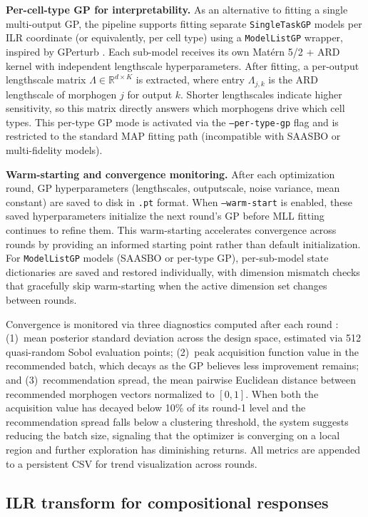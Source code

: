 \documentclass[times,twoside]{zHenriquesLab-StyleBioRxiv}
\newcommand{\Real}{\mathbb{R}}
\begin{document}
\textbf{Per-cell-type GP for interpretability.} As an alternative to fitting a single multi-output GP, the pipeline supports fitting separate \texttt{SingleTaskGP} models per ILR coordinate (or equivalently, per cell type) using a \texttt{ModelListGP} wrapper, inspired by GPerturb \cite{Xing2025gperturb}. Each sub-model receives its own Mat\'{e}rn 5/2 + ARD kernel with independent lengthscale hyperparameters. After fitting, a per-output lengthscale matrix $\Lambda \in \Real^{d \times K}$ is extracted, where entry $\Lambda_{j,k}$ is the ARD lengthscale of morphogen $j$ for output $k$. Shorter lengthscales indicate higher sensitivity, so this matrix directly answers which morphogens drive which cell types. This per-type GP mode is activated via the \texttt{--per-type-gp} flag and is restricted to the standard MAP fitting path (incompatible with SAASBO or multi-fidelity models).

\textbf{Warm-starting and convergence monitoring.} After each optimization round, GP hyperparameters (lengthscales, outputscale, noise variance, mean constant) are saved to disk in \texttt{.pt} format. When \texttt{--warm-start} is enabled, these saved hyperparameters initialize the next round's GP before MLL fitting continues to refine them. This warm-starting accelerates convergence across rounds by providing an informed starting point rather than default initialization. For \texttt{ModelListGP} models (SAASBO or per-type GP), per-sub-model state dictionaries are saved and restored individually, with dimension mismatch checks that gracefully skip warm-starting when the active dimension set changes between rounds.

Convergence is monitored via three diagnostics computed after each round \cite{Narayanan2025}: (1)~mean posterior standard deviation across the design space, estimated via 512 quasi-random Sobol evaluation points; (2)~peak acquisition function value in the recommended batch, which decays as the GP believes less improvement remains; and (3)~recommendation spread, the mean pairwise Euclidean distance between recommended morphogen vectors normalized to $[0,1]$. When both the acquisition value has decayed below 10\% of its round-1 level and the recommendation spread falls below a clustering threshold, the system suggests reducing the batch size, signaling that the optimizer is converging on a local region and further exploration has diminishing returns. All metrics are appended to a persistent CSV for trend visualization across rounds.

\subsection*{ILR transform for compositional responses}
\end{document}
